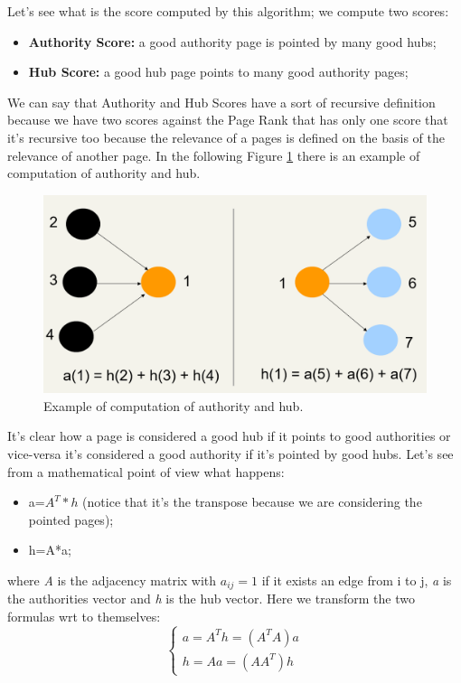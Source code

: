 Let's see what is the score computed by this algorithm; we compute two scores:
\begin{itemize}
    \item \textbf{Authority Score:} a good authority page is pointed by many good hubs;
    \item \textbf{Hub Score:} a good hub page points to many good authority pages;
\end{itemize}
We can say that Authority and Hub Scores have a sort of recursive definition because we have two scores against the Page Rank that has only one score that it's recursive too because the relevance of a pages is defined on the basis of the relevance of another page. In the following Figure \ref{fig:authorityhub} there is an example of computation of authority and hub.\newline
\begin{figure}
    \centering
    \includegraphics[width=0.75\linewidth]{images/authorityhub.PNG}
    \caption{Example of computation of authority and hub.}
    \label{fig:authorityhub}
\end{figure}
It's clear how a page is considered a good hub if it points to good authorities or vice-versa it's considered a good authority if it's pointed by good hubs.\newline
Let's see from a mathematical point of view what happens:
\begin{itemize}
    \item a=$A^T*h$ (notice that it's the transpose because we are considering the pointed pages);
    \item h=A*a;
\end{itemize}
where \textit{A} is the adjacency matrix with $a_{ij}=1$ if it exists an edge from i to j, \textit{a} is the authorities vector and \textit{h} is the hub vector.\newline
Here we transform the two formulas wrt to themselves:
\begin{equation}
  \left\{ \begin{array}{rcl}
    a=A^Th=(A^TA)a \\ h=Aa=(AA^T)h
\end{array}\right.  
\end{equation}
